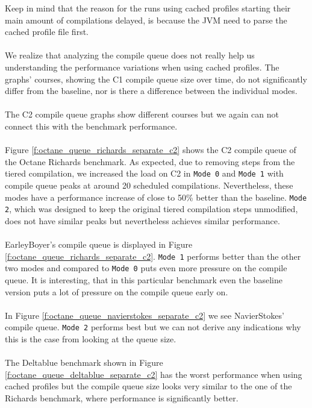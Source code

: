 Keep in mind that the reason for the runs using cached profiles starting their main amount of compilations delayed, is because the JVM need to parse the cached profile file first.
\\\\
We realize that analyzing the compile queue does not really help us understanding the performance variations when using cached profiles.
The graphs' courses, showing the C1 compile queue size over time, do not significantly differ from the baseline, nor is there a difference between the individual modes.
\\\\
The C2 compile queue graphs show different courses but we again can not connect this with the benchmark performance.
\\\\
Figure \ref{f:octane_queue_richards_separate_c2} shows the C2 compile queue of the Octane Richards benchmark. As expected, due to removing steps from the tiered compilation, we increased the load on C2 in \texttt{Mode 0} and \texttt{Mode 1} with compile queue peaks at around 20 scheduled compilations. Nevertheless, these modes have a performance increase of close to 50\% better than the baseline. \texttt{Mode 2}, which was designed to keep the original tiered compilation steps unmodified, does not have similar peaks but nevertheless achieves similar performance.
\\\\
EarleyBoyer's compile queue is displayed in Figure \ref{f:octane_queue_richards_separate_c2}. \texttt{Mode 1} performs better than the other two modes and compared to \texttt{Mode 0} puts even more pressure on the compile queue.
It is interesting, that in this particular benchmark even the baseline version puts a lot of pressure on the compile queue early on.
\\\\
In Figure \ref{f:octane_queue_navierstokes_separate_c2} we see NavierStokes' compile queue. \texttt{Mode 2} performs best but we can not derive any indications why this is the case from looking at the queue size.
\\\\
The Deltablue benchmark shown in Figure \ref{f:octane_queue_deltablue_separate_c2} has the worst performance when using cached profiles but the compile queue size looks very similar to the one of the Richards benchmark, where performance is significantly better.
\\\\
